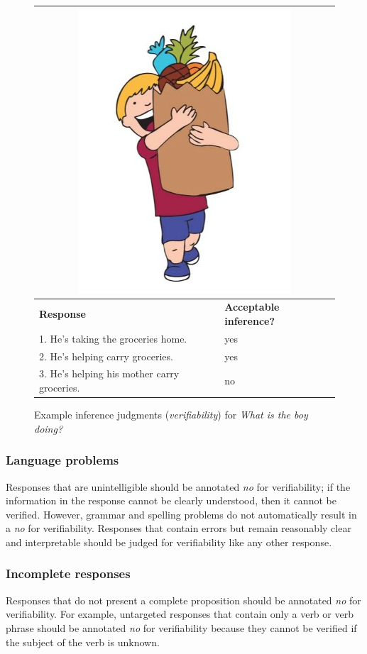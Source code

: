 \documentclass[12pt]{article}
\begin{document}
\begin{figure}[h]
\begin{center}
\begin{tabular}{|p{}|p{}|}
\hline
\multicolumn{2}{|c|}{\includegraphics[width=0.4\columnwidth,trim=0 0 0 -3]{figures/I06.jpg}}\\
\hline
\textbf{Response} & \textbf{Acceptable inference?}\\
\hline
1. He's taking the groceries home. & yes \\
\hline
2. He's helping carry groceries. & yes \\
\hline
3. He's helping his mother carry groceries. & no \\
\hline
\end{tabular}{}
\end{center}
\caption{Example inference judgments (\textit{verifiability}) for \textit{What is the boy doing?}}
\label{fig:carry-groceries}
\end{figure}

\subsubsection{Language problems} Responses that are unintelligible should be annotated \textit{no} for verifiability; if the information in the response cannot be clearly understood, then it cannot be verified. However, grammar and spelling problems do not automatically result in a \textit{no} for verifiability. Responses that contain errors but remain reasonably clear and interpretable should be judged for verifiability like any other response.

\subsubsection{Incomplete responses} Responses that do not present a complete proposition should be annotated \textit{no} for verifiability. For example, untargeted responses that contain only a verb or verb phrase should be annotated \textit{no} for verifiability because they cannot be verified if the subject of the verb is unknown.
\end{document}
